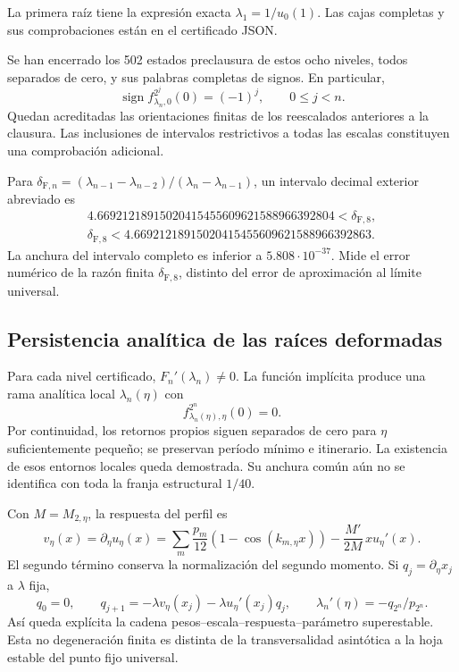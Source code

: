 La primera raíz tiene la expresión exacta \(\lambda_1=1/u_0(1)\). Las cajas completas y sus comprobaciones están en el certificado JSON.

Se han encerrado los 502 estados preclausura de estos ocho niveles, todos separados de cero, y sus palabras completas de signos. En particular,
\[
\operatorname{sign}f_{\lambda_n,0}^{2^j}(0)=(-1)^j,\qquad0\le j<n.
\]
Quedan acreditadas las orientaciones finitas de los reescalados anteriores a la clausura. Las inclusiones de intervalos restrictivos a todas las escalas constituyen una comprobación adicional.

Para \(\delta_{\mathrm F,n}=(\lambda_{n-1}-\lambda_{n-2})/(\lambda_n-\lambda_{n-1})\), un intervalo decimal exterior abreviado es
\[
\boxed{\begin{gathered}
4.66921218915020415455609621588966392804<\delta_{\mathrm F,8},\\
\delta_{\mathrm F,8}<4.66921218915020415455609621588966392863.
\end{gathered}}
\]
La anchura del intervalo completo es inferior a \(5.808\cdot10^{-37}\). Mide el error numérico de la razón finita \(\delta_{\mathrm F,8}\), distinto del error de aproximación al límite universal.


\subsection{Persistencia analítica de las raíces deformadas}
\label{hmtfg:desarrollo:8}

Para cada nivel certificado, \(F_n'(\lambda_n)\ne0\). La función implícita produce una rama analítica local \(\lambda_n(\eta)\) con
\[
f_{\lambda_n(\eta),\eta}^{2^n}(0)=0.
\]
Por continuidad, los retornos propios siguen separados de cero para \(\eta\) suficientemente pequeño; se preservan período mínimo e itinerario. La existencia de esos entornos locales queda demostrada. Su anchura común aún no se identifica con toda la franja estructural \(1/40\).

Con \(M=M_{2,\eta}\), la respuesta del perfil es
\[
v_\eta(x)=\partial_\eta u_\eta(x)
=\sum_m\frac{p_m}{12}(1-\cos(k_{m,\eta}x))
-\frac{M'}{2M}\,x u_\eta'(x).
\]
El segundo término conserva la normalización del segundo momento. Si \(q_j=\partial_\eta x_j\) a \(\lambda\) fija,
\[
q_0=0,\qquad q_{j+1}=-\lambda v_\eta(x_j)-\lambda u_\eta'(x_j)q_j,
\qquad
\boxed{\lambda_n'(\eta)=-q_{2^n}/p_{2^n}}.
\]
Así queda explícita la cadena pesos–escala–respuesta–parámetro superestable. Esta no degeneración finita es distinta de la transversalidad asintótica a la hoja estable del punto fijo universal.



